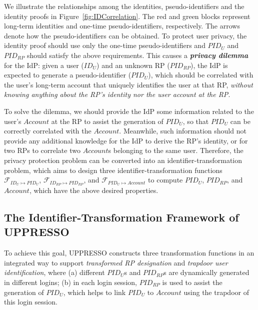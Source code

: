 We illustrate the relationships among the identities, pseudo-identifiers and the identity proofs in Figure~\ref{fig:IDCorrelation}. The red and green blocks represent long-term identities and one-time pseudo-identifiers, respectively. The arrows denote how the pseudo-identifiers can be obtained. To protect user privacy, the identity proof should use only the one-time pseudo-identifiers %
and $PID_U$ and $PID_{RP}$ should satisfy the above requirements. This causes a \textbf{\em privacy dilemma} for the IdP: given a user ($ID_U$) and an unknown RP ($PID_{RP}$), the IdP is expected to generate a pseudo-identifier ($PID_{U}$), which should be correlated with the user's long-term account that uniquely identifies the user at that RP, {\em without knowing anything about the RP's identity nor the user account at the RP}.

To solve the dilemma, we should provide the IdP some information related to the user's $Account$ at the RP to assist the generation of $PID_U$, so that $PID_U$ can be correctly correlated with the $Account$. Meanwhile, such information should not provide any additional knowledge for the IdP to derive the RP's identity, or for two RPs to correlate two $Account$s belonging to the same user. Therefore, the privacy protection problem can be converted into an identifier-transformation problem, which aims to design three identifier-transformation functions $\mathcal{F}_{ID_{U} \mapsto PID_U}$, $\mathcal{F}_{ID_{RP} \mapsto PID_{RP}}$, and $\mathcal{F}_{PID_{U} \mapsto Account}$ to compute $PID_U$, $PID_{RP}$, and $Account$, which have the above desired properties.

\subsection{The Identifier-Transformation Framework of UPPRESSO}
\label{subsec:solutions}

To achieve this goal, UPPRESSO constructs three transformation functions in an integrated way to support {\em transformed RP designation} and {\em trapdoor user identification}, where (a) different $PID_U$s and $PID_{RP}$s are dynamically generated in different logins; (b) in each login session, $PID_{RP}$ is used to assist the generation of $PID_U$, which helps to link $PID_U$ to $Account$ using the trapdoor of this login session.%


